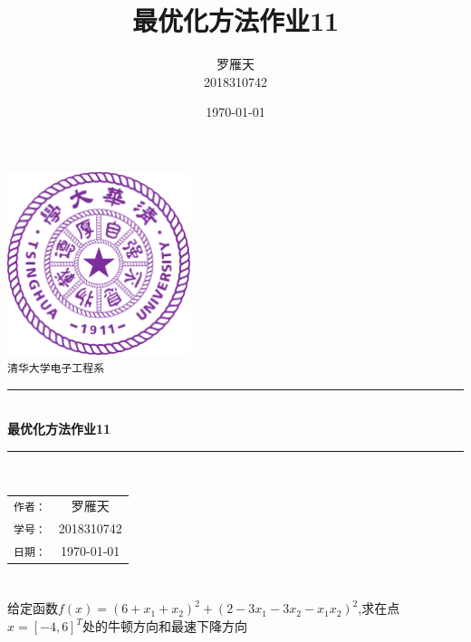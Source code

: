 \documentclass[a4paper]{article}
\title{最优化方法作业11}
\author{罗雁天 \\
2018310742}
\date{\today}
\begin{document}
\newcommand{\HRule}{\rule{\linewidth}{0.5mm}}
\begin{titlepage}
	\begin{center}
		\includegraphics[width=0.4\textwidth]{Tsinghua2.png}\\[1cm]
		\textsc{\Large \texttt{清华大学电子工程系}}\\[1cm]
		\HRule \\[1cm]
		{\Huge \bfseries 最优化方法作业11}\\[0.4cm]
		\HRule \\[3.5cm]
		\begin{minipage}{0.4\textwidth}
			\begin{center}
				\Large
				\begin{tabular}{cc}
					\texttt{作者：} & 罗雁天 \\[0.5cm]
					\texttt{学号：} & 2018310742 \\[0.5cm]
					\texttt{日期：} & \today
				\end{tabular}
			\end{center}
		\end{minipage}
		\vfill
	\end{center}
\end{titlepage}

\section{}
给定函数$f(x)=(6+x_1+x_2)^2+(2-3x_1-3x_2-x_1x_2)^2$,求在点$\hat{x}=[-4,6]^T$处的牛顿方向和最速下降方向
\end{document}
